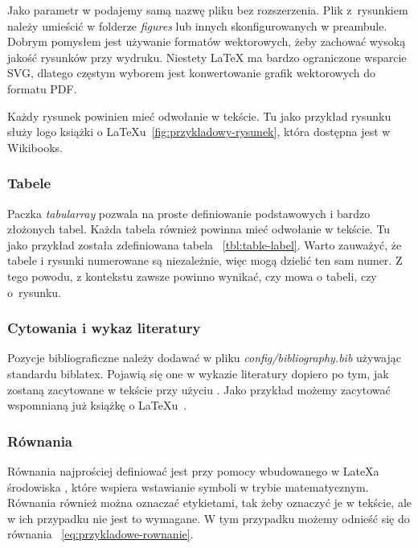 Jako parametr w  podajemy samą
nazwę pliku bez rozszerzenia. Plik z~rysunkiem należy umieścić
w folderze \emph{figures} lub innych skonfigurowanych w preambule.
Dobrym pomysłem jest używanie formatów wektorowych, żeby zachować wysoką
jakość rysunków przy wydruku. Niestety LaTeX ma bardzo ograniczone
wsparcie SVG, dlatego częstym wyborem jest konwertowanie grafik
wektorowych do formatu PDF\@.

Każdy rysunek powinien mieć odwołanie w tekście. Tu jako przykład
rysunku służy logo książki o LaTeXu~\ref{fig:przykladowy-rysunek}, która
dostępna jest w Wikibooks.

\subsubsection{Tabele}



Paczka \emph{tabularray} pozwala na proste definiowanie podstawowych
i bardzo złożonych tabel. Każda tabela również powinna mieć odwołanie
w tekście. Tu jako przykład została zdefiniowana tabela
~\ref{tbl:table-label}. Warto zauważyć, że tabele i rysunki
numerowane są niezależnie, więc mogą dzielić ten sam numer. Z tego
powodu, z kontekstu zawsze powinno wynikać, czy mowa o tabeli, czy
o~rysunku.

\subsubsection{Cytowania i wykaz literatury}

Pozycje bibliograficzne należy dodawać w pliku
\emph{config/bibliography.bib} używając standardu biblatex. Pojawią się
one w wykazie literatury dopiero po tym, jak zostaną zacytowane w tekście
przy użyciu . Jako przykład możemy zacytować
wspomnianą już książkę o LaTeXu~\cite{book:latex}.

\subsubsection{Równania}

Równania najprościej definiować jest przy pomocy wbudowanego w LateXa
środowiska , które wspiera wstawianie
symboli w trybie matematycznym. Równania również można oznaczać
etykietami, tak żeby oznaczyć je w tekście, ale w ich przypadku nie jest
to wymagane. W tym przypadku możemy odnieść się do równania
~\ref{eq:przykladowe-rownanie}.

